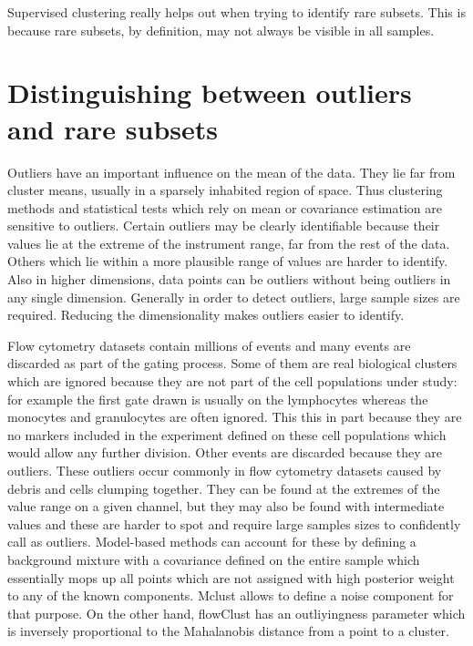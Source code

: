 Supervised clustering really helps out when trying to identify rare subsets.
This is because rare subsets, by definition, may not always be visible in all samples.


\section{ Distinguishing between outliers and rare subsets }

Outliers have an important influence on the mean of the data.
They lie far from cluster means, usually in a sparsely inhabited region of space.
Thus clustering methods and statistical tests which rely on mean or covariance estimation are sensitive to outliers.
Certain outliers may be clearly identifiable because their values lie at the extreme of the instrument range,
far from the rest of the data.
Others which lie within a more plausible range of values are harder to identify.
Also in higher dimensions, data points can be outliers without being outliers in any single dimension.
Generally in order to detect outliers, large sample sizes are required.
Reducing the dimensionality makes outliers easier to identify.

Flow cytometry datasets contain millions of events and many events are discarded as part of the gating process.
Some of them are real biological clusters which are ignored because they are not part of the cell populations under study:
for example the first gate drawn is usually on the lymphocytes whereas the monocytes and granulocytes are often ignored.
This this in part because they are no markers included in the experiment defined on these cell populations which would allow any further division.
Other events are discarded because they are outliers. These outliers occur commonly in flow cytometry datasets caused by debris and cells clumping together.
They can be found at the extremes of the value range on a given channel, but they may also be found with intermediate values and these are harder to spot and require large samples sizes to confidently call as outliers.
Model-based methods can account for these by defining a background mixture with a covariance defined on the entire sample which essentially mops up all points
which are not assigned with high posterior weight to any of the known components.
Mclust allows to define a noise component for that purpose.
On the other hand, flowClust  has an outliyingness parameter which is inversely proportional to the Mahalanobis distance from a point to a cluster.

